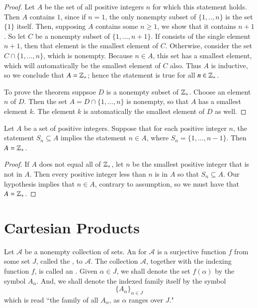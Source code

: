 \documentclass[12pt, a4paper, oneside, openright, titlepage]{book}
\begin{document}
\begin{appendices}
\begin{proof}
        Let $A$ be the set of all positive integers $n$ for which this statement holds. Then $A$ contains $1$, since if $n = 1$, the only nonempty subset of $\{1,..,n\}$ is the set $\{1\}$ itself. Then, supposing $A$ contains some $n \geq 1$, we show that it contains $n+1$. So let $C$ be a nonempty subset of $\{1,...,n+1\}$. If consists of the single element $n+1$, then that element is the smallest element of $C$. Otherwise, consider the set $C\cap\{1,...,n\}$, which is nonempty. Because $n \in A$, this set has a smallest element, which will automatically be the smallest element of $C$ also. Thus $A$ is inductive, so we conclude that $A = \mathbb Z_+$; hence the statement is true for all $n \in \mathbb Z_+$.

        To prove the theorem suppsoe $D$ is a nonempty subset of $\mathbb Z_+$. Choose an element $n$ of $D$. Then the set $A = D\cap\{1,...,n\}$ is nonempty, so that $A$ has a smallest element $k$. The element $k$ is automatically the smallest element of $D$ as well.
    \end{proof}

    \begin{theorem}
        Let $A$ be a set of positive integers. Suppose that for each positive integer $n$, the statement $S_n \subseteq A$ implies the statement $n \in A$, where $S_n = \{1,...,n-1\}$. Then $A = \mathbb Z_+$.
    \end{theorem}
    \begin{proof}
        If $A$ does not equal all of $\mathbb Z_+$, let $n$ be the smallest positive integer that is not in $A$. Then every positive integer less than $n$ is in $A$ so that $S_n \subseteq A$. Our hypothesis implies that $n \in A$, contrary to assumption, so we must have that $A = \mathbb Z_+$.
    \end{proof}


    \section{Cartesian Products}

    \begin{definition}
        Let $\mathscr{A}$ be a nonempty collection of sets. An  for $\mathscr{A}$ is a surjective function $f$ from some set $J$, called the , to $\mathscr{A}$. The collection $\mathscr{A}$, together with the indexing function $f$, is called an . Given $\alpha \in J$, we shall denote the set $f(\alpha)$ by the symbol $A_{\alpha}$. And, we shall denote the indexed family itself by the symbol \begin{equation*}
            \{A_{\alpha}\}_{\alpha \in J}
        \end{equation*}
        which is read ``the family of all $A_{\alpha}$, as $\alpha$ ranges over $J$."
    \end{definition}


\end{appendices}
\end{document}
